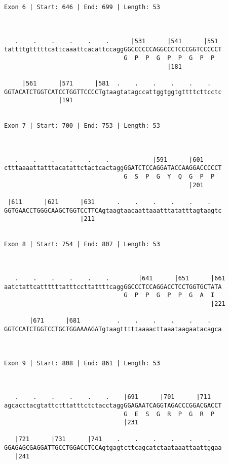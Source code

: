 \documentclass{article}
\begin{document}
\begin{Verbatim}
Exon 6 | Start: 646 | End: 699 | Length: 53



   .    .    .    .    .    .      |531      |541      |551 
tattttgtttttcattcaaattcacattccaggGGCCCCCCAGGCCCTCCCGGTCCCCCT
                                 G  P  P  G  P  P  G  P  P  
                                             |181           
  
     |561      |571      |581  .    .    .    .    .    .   
GGTACATCTGGTCATCCTGGTTCCCCTgtaagtatagccattggtggtgttttcttcctc
               |191                                         
  
 
Exon 7 | Start: 700 | End: 753 | Length: 53



   .    .    .    .    .    .            |591      |601     
ctttaaaattatttacatattctactcactaggGGATCTCCAGGATACCAAGGACCCCCT
                                 G  S  P  G  Y  Q  G  P  P  
                                                   |201     
  
 |611      |621      |631      .    .    .    .    .    .   
GGTGAACCTGGGCAAGCTGGTCCTTCAgtaagtaacaattaaatttatatttagtaagtc
                     |211                                   
  
 
Exon 8 | Start: 754 | End: 807 | Length: 53



   .    .    .    .    .    .        |641      |651      |661
aatctattcattttttatttccttattttcaggGGCCCTCCAGGACCTCCTGGTGCTATA
                                 G  P  P  G  P  P  G  A  I  
                                                         |221
  
       |671      |681          .    .    .    .    .    .   
GGTCCATCTGGTCCTGCTGGAAAAGATgtaagtttttaaaacttaaataagaatacagca
                                                            
  
 
Exon 9 | Start: 808 | End: 861 | Length: 53



   .    .    .    .    .    .    |691      |701      |711   
agcacctacgtattctttatttctctacctaggGGAGAATCAGGTAGACCCGGACGACCT
                                 G  E  S  G  R  P  G  R  P  
                                 |231                       
  
   |721      |731      |741    .    .    .    .    .    .   
GGAGAGCGAGGATTGCCTGGACCTCCAgtgagtcttcagcatctaataaattaattggaa
   |241                                                     
  

\end{Verbatim}
\end{document}
